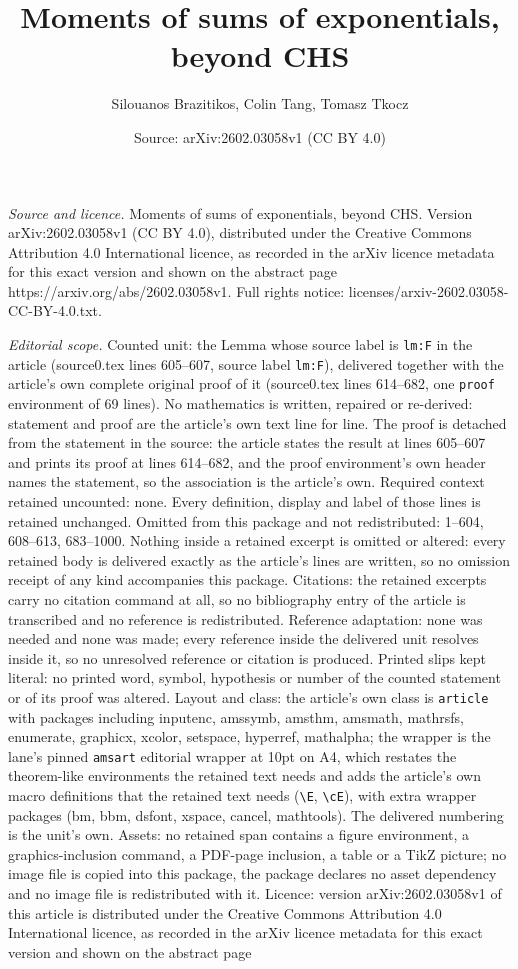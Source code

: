 \documentclass[10pt,a4paper]{amsart}
\title[Moments of sums of exponentials, beyond CHS]{Moments of sums of exponentials, beyond CHS}
\author{Silouanos Brazitikos, Colin Tang, Tomasz Tkocz}
\date{Source: arXiv:2602.03058v1 (CC BY 4.0)}
\begin{document}
\maketitle

\noindent\emph{Source and licence.} Moments of sums of exponentials, beyond CHS. Version arXiv:2602.03058v1 (CC BY 4.0), distributed under the Creative Commons Attribution 4.0 International licence, as recorded in the arXiv licence metadata for this exact version and shown on the abstract page https://arxiv.org/abs/2602.03058v1. Full rights notice: licenses/arxiv-2602.03058-CC-BY-4.0.txt.\par\smallskip

\noindent\textit{Editorial scope.} Counted unit: the Lemma whose source label is \texttt{lm:F} in the article (source0.tex lines 605--607, source label \texttt{lm:F}), delivered together with the article's own complete original proof of it (source0.tex lines 614--682, one \texttt{proof} environment of 69 lines). No mathematics is written, repaired or re-derived: statement and proof are the article's own text line for line. The proof is detached from the statement in the source: the article states the result at lines 605--607 and prints its proof at lines 614--682, and the proof environment's own header names the statement, so the association is the article's own. Required context retained uncounted: none. Every definition, display and label of those lines is retained unchanged. Omitted from this package and not redistributed: 1--604, 608--613, 683--1000. Nothing inside a retained excerpt is omitted or altered: every retained body is delivered exactly as the article's lines are written, so no omission receipt of any kind accompanies this package. Citations: the retained excerpts carry no citation command at all, so no bibliography entry of the article is transcribed and no reference is redistributed. Reference adaptation: none was needed and none was made; every reference inside the delivered unit resolves inside it, so no unresolved reference or citation is produced. Printed slips kept literal: no printed word, symbol, hypothesis or number of the counted statement or of its proof was altered. Layout and class: the article's own class is \texttt{article} with packages including inputenc, amssymb, amsthm, amsmath, mathrsfs, enumerate, graphicx, xcolor, setspace, hyperref, mathalpha; the wrapper is the lane's pinned \texttt{amsart} editorial wrapper at 10pt on A4, which restates the theorem-like environments the retained text needs and adds the article's own macro definitions that the retained text needs (\texttt{\textbackslash E}, \texttt{\textbackslash cE}), with extra wrapper packages (bm, bbm, dsfont, xspace, cancel, mathtools). The delivered numbering is the unit's own. Assets: no retained span contains a figure environment, a graphics-inclusion command, a PDF-page inclusion, a table or a TikZ picture; no image file is copied into this package, the package declares no asset dependency and no image file is redistributed with it. Licence: version arXiv:2602.03058v1 of this article is distributed under the Creative Commons Attribution 4.0 International licence, as recorded in the arXiv licence metadata for this exact version and shown on the abstract page 
\end{document}
